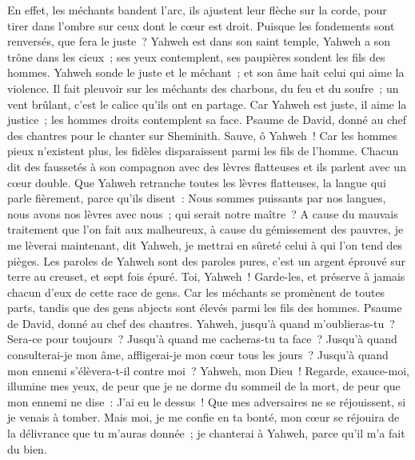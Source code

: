 \begin{multicols}{2}
En effet, les méchants bandent l'arc, ils ajustent leur flèche sur la corde, pour tirer dans l'ombre sur ceux dont le cœur est droit.
Puisque les fondements sont renversés, que fera le juste~?
Yahweh est dans son saint temple, Yahweh a son trône dans les cieux~; ses yeux contemplent, ses paupières sondent les fils des hommes.
Yahweh sonde le juste et le méchant~; et son âme hait celui qui aime la violence.
Il fait pleuvoir sur les méchants des charbons, du feu et du soufre~; un vent brûlant, c'est le calice qu'ils ont en partage.
Car Yahweh est juste, il aime la justice~; les hommes droits contemplent sa face.
\VerseOne{}Psaume de David, donné au chef des chantres pour le chanter sur Sheminith.
Sauve, ô Yahweh~! Car les hommes pieux n'existent plus, les fidèles disparaissent parmi les fils de l'homme.
Chacun dit des faussetés à son compagnon avec des lèvres flatteuses et ils parlent avec un cœur double.
Que Yahweh retranche toutes les lèvres flatteuses, la langue qui parle fièrement,
parce qu'ils disent~: Nous sommes puissants par nos langues, nous avons nos lèvres avec nous~; qui serait notre maître~?
A cause du mauvais traitement que l'on fait aux malheureux, à cause du gémissement des pauvres, je me lèverai maintenant, dit Yahweh, je mettrai en sûreté celui à qui l'on tend des pièges.
Les paroles de Yahweh sont des paroles pures, c'est un argent éprouvé sur terre au creuset, et sept fois épuré.
Toi, Yahweh~! Garde-les, et préserve à jamais chacun d'eux de cette race de gens.
Car les méchants se promènent de toutes parts, tandis que des gens abjects sont élevés parmi les fils des hommes.
\VerseOne{}Psaume de David, donné au chef des chantres.
Yahweh, jusqu'à quand m'oublieras-tu~? Sera-ce pour toujours~? Jusqu'à quand me cacheras-tu ta face~?
Jusqu'à quand consulterai-je mon âme, affligerai-je mon cœur tous les jours~? Jusqu'à quand mon ennemi s'élèvera-t-il contre moi~?
Yahweh, mon Dieu~! Regarde, exauce-moi, illumine mes yeux, de peur que je ne dorme du sommeil de la mort,
de peur que mon ennemi ne dise~: J'ai eu le dessus~! Que mes adversaires ne se réjouissent, si je venais à tomber.
Mais moi, je me confie en ta bonté, mon cœur se réjouira de la délivrance que tu m'auras donnée~; je chanterai à Yahweh, parce qu'il m'a fait du bien.

\end{multicols}
